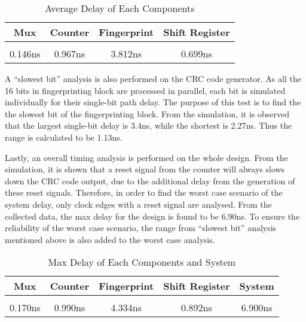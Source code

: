 \documentclass[10pt,journal,compsoc]{IEEEtran}
\begin{document}
\begin{table}[ht] 
\caption{Average Delay of Each Components} %
\centering %
\begin{tabular}{c c c c } %
\hline\hline %
Mux & Counter & Fingerprint & Shift Register\\ [0.5ex] %
\hline %
\\ [0.2 ex]
0.146ns & 0.967ns & 3.812ns & 0.699ns \\ [1ex] %
\hline %
\end{tabular} 
\label{table:nonlin} %
\end{table} 

    A “slowest bit” analysis is also performed on the CRC code generator. As all the 16 bits in fingerprinting block are processed in parallel, each bit is simulated individually for their single-bit path delay. The purpose of this test is to find the the slowest bit of the fingerprinting block. From the simulation, it is observed that the largest single-bit delay is 3.4ns, while the shortest is 2.27ns. Thus the range is calculated to be 1.13ns.
    
    Lastly, an overall timing analysis is performed on the whole design. From the simulation, it is shown that a reset signal from the counter will always slows down the CRC code output, due to the additional delay from the generation of these reset signals. Therefore, in order to find the worst case scenario of the system delay, only clock edges with a reset signal are analysed. From the collected data, the max delay for the design is found to be 6.90ns. To ensure the reliability of the worst case scenario, the range from “slowest bit” analysis mentioned above is also added to the worst case analysis.
    
    \begin{table}[ht] 
\caption{Max Delay of Each Components and System} %
\centering %
\begin{tabular}{c c c c c} %
\hline\hline %
Mux & Counter & Fingerprint & Shift Register & System\\ [0.5ex] %
\hline %
\\ [0.2 ex]
0.170ns & 0.990ns & 4.334ns & 0.892ns & 6.900ns \\ [1ex] %
\hline %
\end{tabular} 
\label{table:nonlin} %
\end{table} 
\end{document}
